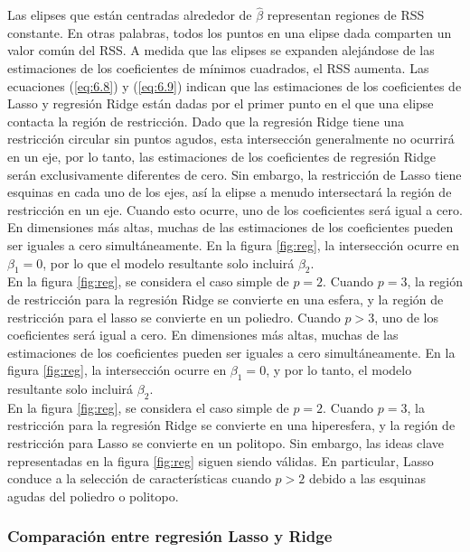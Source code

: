 Las elipses que están centradas alrededor de $\hat{\beta}$ representan regiones de RSS constante. En otras palabras, todos los puntos en una elipse dada comparten un valor común del RSS. A medida que las elipses se expanden alejándose de las estimaciones de los coeficientes de mínimos cuadrados, el RSS aumenta. Las ecuaciones (\ref{eq:6.8}) y (\ref{eq:6.9}) indican que las estimaciones de los coeficientes de Lasso y regresión Ridge están dadas por el primer punto en el que una elipse contacta la región de restricción. Dado que la regresión Ridge tiene una restricción circular sin puntos agudos, esta intersección generalmente no ocurrirá en un eje, por lo tanto, las estimaciones de los coeficientes de regresión Ridge serán exclusivamente diferentes de cero. Sin embargo, la restricción de Lasso tiene esquinas en cada uno de los ejes, así la elipse a menudo intersectará la región de restricción en un eje. Cuando esto ocurre, uno de los coeficientes será igual a cero. En dimensiones más altas, muchas de las estimaciones de los coeficientes pueden ser iguales a cero simultáneamente. En la figura \ref{fig:reg}, la intersección ocurre en $\beta_1 = 0$, por lo que el modelo resultante solo incluirá $\beta_2$. \\

En la figura \ref{fig:reg}, se considera el caso simple de $p = 2$. Cuando $p = 3$, la región de restricción para la regresión Ridge se convierte en una esfera, y la región de restricción para el lasso se convierte en un poliedro. Cuando $p > 3$, uno de los coeficientes será igual a cero. En dimensiones más altas, muchas de las estimaciones de los coeficientes pueden ser iguales a cero simultáneamente. En la figura \ref{fig:reg}, la intersección ocurre en $\beta_1 = 0$, y por lo tanto, el modelo resultante solo incluirá $\beta_2$. \\

En la figura \ref{fig:reg}, se considera el caso simple de $p = 2$. Cuando $p = 3$, la restricción para la regresión Ridge se convierte en una hiperesfera, y la región de restricción para Lasso se convierte en un politopo. Sin embargo, las ideas clave representadas en la figura \ref{fig:reg} siguen siendo válidas. En particular, Lasso conduce a la selección de características cuando $p > 2$ debido a las esquinas agudas del poliedro o politopo.

\subsubsection{Comparación entre regresión Lasso y Ridge}

